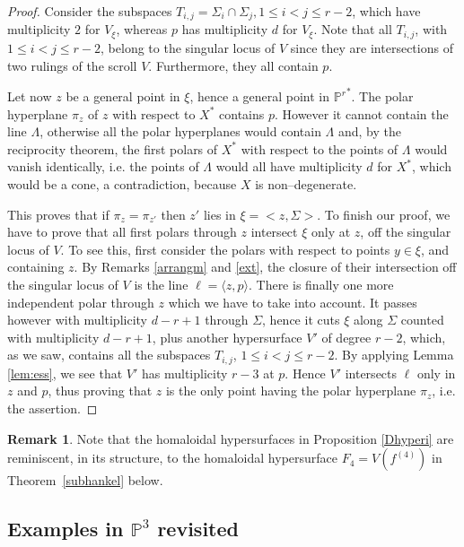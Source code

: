 \documentclass[11pt]{article}   %
\theoremstyle{definition}
\newtheorem{Remark}[Theorem]{Remark}
\numberwithin{Theorem}{section} \numberwithin{equation}{section}
\newcommand{\p}{{\mathbb P}}
\begin{document}
{\begin{proof}
Consider the subspaces $T_{i,j}=\Sigma_i\cap
\Sigma_j, 1\leq i<j\leq r-2$, which have multiplicity $2$
for $V_\xi$, whereas $p$ has multiplicity $d$ for $V_\xi$. Note that
all $T_{i,j}$, with $1\leq i<j\leq r-2$, belong to the singular locus of $V$ since they are
intersections of two rulings of the scroll $V$. Furthermore, they all contain $p$.

Let now $z$ be a general point in $\xi$, hence a general point in ${\p^ r}^ *$.
The polar hyperplane $\pi_z$ of $z$ with respect to $X^ *$ contains $p$.
However it cannot contain the line $\Lambda$, otherwise all the polar
hyperplanes would contain $\Lambda$ and, by the reciprocity theorem, the
first polars of $X^ *$ with respect to the points of $\Lambda$ would vanish
identically, i.e. the points of $\Lambda$ would all have multiplicity $d$ for
$X^ *$, which would be a cone, a contradiction, because $X$ is
non--degenerate.

This proves that if $\pi_z=\pi_{z'}$ then $z'$ lies in $\xi=<z,\Sigma>$.
To finish our proof, we have to prove that all first polars through $z$
intersect $\xi$ only at $z$, off the singular locus of $V$.
To see this, first consider the polars with respect to points $y\in
\xi$, and containing $z$. By Remarks \ref {arrangm} and \ref {ext}, the closure
of their  intersection off the singular locus of $V$ is the line $\ell=\langle z,p\rangle$.
There is finally one more independent polar  through $z$ which we have to
take into account. It passes however with multiplicity $d-r+1$ through
$\Sigma$, hence it cuts $\xi$ along $\Sigma$ counted with
multiplicity $d-r+1$, plus another hypersurface $V'$ of degree $r-2$, which,
as we saw,
contains all the subspaces $T_{i,j}$, $1\leq i<j\leq r-2$.
By applying Lemma \ref  {lem:ess}, we see that $V'$ has multiplicity $r-3$ at
$p$. Hence $V'$ intersects $\ell$ only in $z$
and $p$, thus proving that $z$ is the only point having the polar
hyperplane $\pi_z$, i.e. the assertion.
\end{proof}

\begin{Remark}\label{reflection} Note that the homaloidal hypersurfaces
in Proposition \ref{Dhyperi} are reminiscent, in its structure, to
the homaloidal hypersurface $F_4=V(f^{(4)})$ in
Theorem~\ref{subhankel} below.
\end{Remark}


\subsection{Examples in $\p^ 3$ revisited}\label{sing}

}
\end{document}
